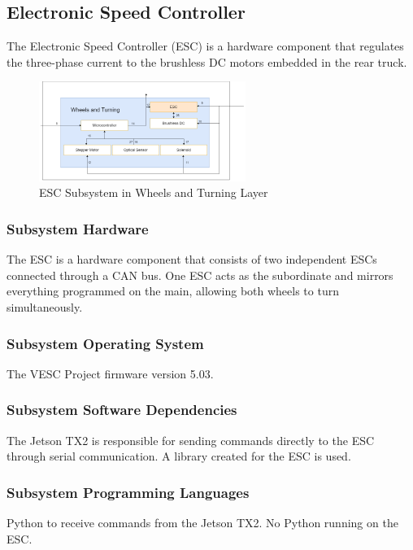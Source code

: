 \subsection{Electronic Speed Controller}
The Electronic Speed Controller (ESC) is a hardware component that regulates the three-phase current to the brushless DC motors embedded in the rear truck.

\begin{figure}[h!]
	\centering
 	\includegraphics[width=0.60\textwidth]{images/Keaton/ESC.png}
 \caption{ESC Subsystem in Wheels and Turning Layer}
\end{figure}

\subsubsection{Subsystem Hardware}
The ESC is a hardware component that consists of two independent ESCs connected through a CAN bus. One ESC acts as the subordinate and mirrors everything programmed on the main, allowing both wheels to turn simultaneously.

\subsubsection{Subsystem Operating System}
The VESC Project firmware version 5.03.

\subsubsection{Subsystem Software Dependencies}
The Jetson TX2 is responsible for sending commands directly to the ESC through serial communication. A library created for the ESC is used.

\subsubsection{Subsystem Programming Languages}
Python to receive commands from the Jetson TX2. No Python running on the ESC.

